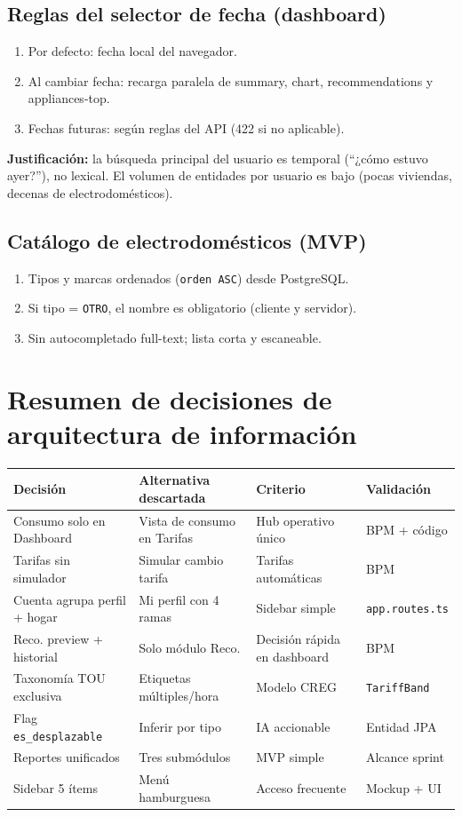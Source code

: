 \documentclass[11pt,a4paper]{article}
\begin{document}
\subsection{Reglas del selector de fecha (dashboard)}

\begin{enumerate}[leftmargin=*]
  \item Por defecto: fecha local del navegador.
  \item Al cambiar fecha: recarga paralela de summary, chart, recommendations y appliances-top.
  \item Fechas futuras: según reglas del API (422 si no aplicable).
\end{enumerate}

\textbf{Justificación:} la búsqueda principal del usuario es temporal (``¿cómo estuvo ayer?''), no lexical. El volumen de entidades por usuario es bajo (pocas viviendas, decenas de electrodomésticos).

\subsection{Catálogo de electrodomésticos (MVP)}

\begin{enumerate}[leftmargin=*]
  \item Tipos y marcas ordenados (\texttt{orden ASC}) desde PostgreSQL.
  \item Si tipo = \texttt{OTRO}, el nombre es obligatorio (cliente y servidor).
  \item Sin autocompletado full-text; lista corta y escaneable.
\end{enumerate}

\section{Resumen de decisiones de arquitectura de información}

{\scriptsize
\begin{longtable}{@{}L{3.2cm}L{3.2cm}L{3.5cm}L{3.5cm}@{}}
\toprule
\textbf{Decisión} & \textbf{Alternativa descartada} & \textbf{Criterio} & \textbf{Validación} \\
\midrule
Consumo solo en Dashboard & Vista de consumo en Tarifas & Hub operativo único & BPM + código \\
Tarifas sin simulador & Simular cambio tarifa & Tarifas automáticas & BPM \\
Cuenta agrupa perfil + hogar & Mi perfil con 4 ramas & Sidebar simple & \texttt{app.routes.ts} \\
Reco. preview + historial & Solo módulo Reco. & Decisión rápida en dashboard & BPM \\
Taxonomía TOU exclusiva & Etiquetas múltiples/hora & Modelo CREG & \texttt{TariffBand} \\
Flag \texttt{es\_desplazable} & Inferir por tipo & IA accionable & Entidad JPA \\
Reportes unificados & Tres submódulos & MVP simple & Alcance sprint \\
Sidebar 5 ítems & Menú hamburguesa & Acceso frecuente & Mockup + UI \\
\bottomrule
\end{longtable}
}
\end{document}
